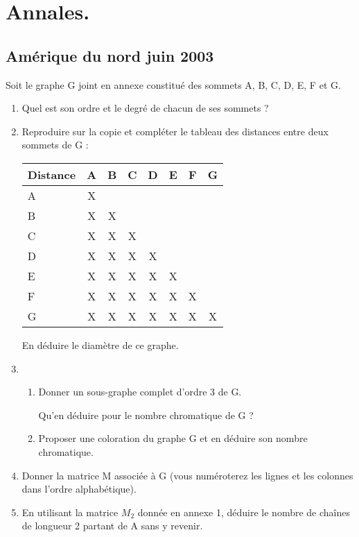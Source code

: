 \section{Annales.}  %
\subsection{Amérique du nord juin 2003}

Soit le graphe G joint en annexe constitué des sommets A, B, C, D, E, F et G.

\begin{enumerate} 
\item Quel est son ordre et le degré de chacun de ses sommets ?
\item Reproduire sur la copie et compléter le tableau des distances entre deux sommets de G :

\medskip
\begin{center} 
\begin{tabular}{|l|c|c|c|c|c|c|c|}\hline
Distance    &    A  &   B   &   C   &   D   &   E   &   F   &   G   \\ \hline
A           &    X  &       &       &       &       &       &       \\ \hline
B           &    X  &   X   &       &       &       &       &       \\ \hline
C           &    X  &   X   &   X   &       &       &       &       \\ \hline
D           &    X  &   X   &   X   &   X   &       &       &       \\ \hline
E           &    X  &   X   &   X   &   X   &   X   &       &       \\ \hline
F           &    X  &   X   &   X   &   X   &   X   &   X   &       \\ \hline
G           &    X  &   X   &   X   &   X   &   X   &   X   &   X   \\ \hline
\end{tabular}
\end{center}

\medskip
En déduire le diamètre de ce graphe.
\item 
   \begin{enumerate} 
   \item Donner un sous-graphe complet d'ordre 3 de G.

Qu'en déduire pour le nombre chromatique de G ?
   \item Proposer une coloration du graphe G et en déduire son nombre chromatique.
   \end{enumerate}
\item Donner la matrice M associée à G (vous numéroterez les lignes et les  colonnes dans l'ordre alphabétique).
\item En utilisant la matrice $ M_2$ donnée en annexe 1, déduire le nombre de chaînes de longueur 2 partant de A sans y revenir.
\end{enumerate}

